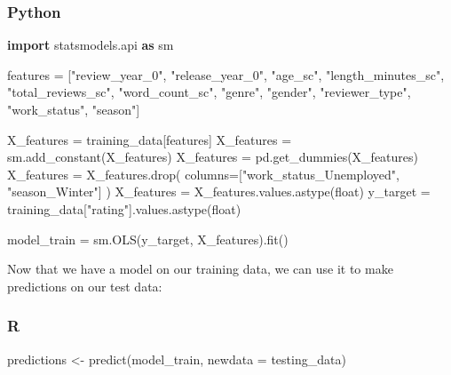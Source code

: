 \documentclass[
  letterpaper,
]{krantz}
\newenvironment{Shaded}{}{}
\newcommand{\AttributeTok}[1]{\textcolor[rgb]{0.49,0.56,0.16}{#1}}
\newcommand{\BuiltInTok}[1]{\textcolor[rgb]{0.00,0.50,0.00}{#1}}
\newcommand{\FunctionTok}[1]{\textcolor[rgb]{0.02,0.16,0.49}{#1}}
\newcommand{\ImportTok}[1]{\textcolor[rgb]{0.00,0.50,0.00}{\textbf{#1}}}
\newcommand{\NormalTok}[1]{#1}
\newcommand{\OperatorTok}[1]{\textcolor[rgb]{0.40,0.40,0.40}{#1}}
\newcommand{\OtherTok}[1]{\textcolor[rgb]{0.00,0.44,0.13}{#1}}
\newcommand{\StringTok}[1]{\textcolor[rgb]{0.25,0.44,0.63}{#1}}
\begin{document}
\subsubsection{Python}

\begin{Shaded}
\begin{Highlighting}[]
\ImportTok{import}\NormalTok{ statsmodels.api }\ImportTok{as}\NormalTok{ sm}

\NormalTok{features }\OperatorTok{=}\NormalTok{ [}\StringTok{"review\_year\_0"}\NormalTok{, }\StringTok{"release\_year\_0"}\NormalTok{,}
  \StringTok{"age\_sc"}\NormalTok{, }\StringTok{"length\_minutes\_sc"}\NormalTok{, }
  \StringTok{"total\_reviews\_sc"}\NormalTok{, }\StringTok{"word\_count\_sc"}\NormalTok{, }
  \StringTok{"genre"}\NormalTok{, }\StringTok{"gender"}\NormalTok{, }
  \StringTok{"reviewer\_type"}\NormalTok{, }\StringTok{"work\_status"}\NormalTok{, }
  \StringTok{"season"}\NormalTok{]}

\NormalTok{X\_features }\OperatorTok{=}\NormalTok{ training\_data[features]}
\NormalTok{X\_features }\OperatorTok{=}\NormalTok{ sm.add\_constant(X\_features)}
\NormalTok{X\_features }\OperatorTok{=}\NormalTok{ pd.get\_dummies(X\_features)}
\NormalTok{X\_features }\OperatorTok{=}\NormalTok{ X\_features.drop(}
\NormalTok{  columns}\OperatorTok{=}\NormalTok{[}\StringTok{"work\_status\_Unemployed"}\NormalTok{, }\StringTok{"season\_Winter"}\NormalTok{]}
\NormalTok{  )}
\NormalTok{X\_features }\OperatorTok{=}\NormalTok{ X\_features.values.astype(}\BuiltInTok{float}\NormalTok{)}
\NormalTok{y\_target }\OperatorTok{=}\NormalTok{ training\_data[}\StringTok{"rating"}\NormalTok{].values.astype(}\BuiltInTok{float}\NormalTok{)}

\NormalTok{model\_train }\OperatorTok{=}\NormalTok{ sm.OLS(y\_target, X\_features).fit()}
\end{Highlighting}
\end{Shaded}

Now that we have a model on our training data, we can use it to make
predictions on our test data:

\subsubsection{R}

\begin{Shaded}
\begin{Highlighting}[]
\NormalTok{predictions }\OtherTok{\textless{}{-}} \FunctionTok{predict}\NormalTok{(model\_train, }\AttributeTok{newdata =}\NormalTok{ testing\_data)}
\end{Highlighting}
\end{Shaded}
\end{document}
